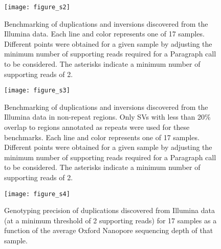 \documentclass[12pt]{article}
\newenvironment{cfigure}
	{\begin{figure} \centering}
	{\end{figure}}
\begin{document}
\clearpage%

\begin{cfigure}
	\texttt{[image: figure\_s2]}

	\caption[Illumina duplication and inversion benchmarks]{
		Benchmarking of duplications and inversions discovered from the Illumina data. 
		Each line and color represents one of 17 samples. 
		Different points were obtained for a given sample by adjusting the minimum number of supporting reads required for a Paragraph call to be considered. 
		The asterisks indicate a minimum number of supporting reads of 2.
	}

	\label{fig_s2}

\end{cfigure}

\clearpage%

\begin{cfigure}
	\texttt{[image: figure\_s3]}

	\caption[Illumina duplication and inversion benchmarks in non-repeat regions]{
		Benchmarking of duplications and inversions discovered from the Illumina data in non-repeat regions. 
		Only SVs with less than 20\% overlap to regions annotated as repeats were used for these benchmarks. 
		Each line and color represents one of 17 samples. 
		Different points were obtained for a given sample by adjusting the minimum number of supporting reads required for a Paragraph call to be considered. 
		The asterisks indicate a minimum number of supporting reads of 2.
	}

	\label{fig_s3}

\end{cfigure}

\clearpage%

\begin{cfigure}
	\texttt{[image: figure\_s4]}

	\caption[Relationship between Oxford Nanopore sequencing depth and genotyping precision of Illumina duplications]{
		Genotyping precision of duplications discovered from Illumina data (at a minimum threshold of 2 supporting reads) for 17 samples as a function of the average Oxford Nanopore sequencing depth of that sample.
	}

	\label{fig_s4}

\end{cfigure}
\end{document}
